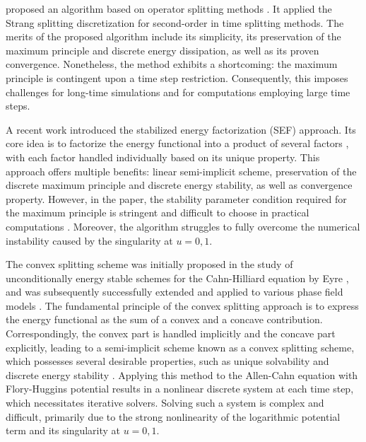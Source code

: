 \par \cite{li2022stability} proposed an algorithm based on operator splitting methods \cite{macnamara2017operator}. 
It applied the Strang splitting discretization \cite{strang1968construction} for second-order in time splitting methods. 
The merits of the proposed algorithm include its simplicity, its preservation of the maximum principle and discrete energy dissipation, as well as its proven convergence. 
Nonetheless, the method exhibits a shortcoming: the maximum principle is contingent upon a time step restriction. 
Consequently, this imposes challenges for long-time simulations and for computations employing large time steps.
\par A recent work \cite{wang2020stabilized} introduced the stabilized energy factorization (SEF) approach. 
Its core idea is to factorize the energy functional into a product of several factors  \cite{kou2020novel}, 
with each factor handled individually based on its unique property. 
This approach offers multiple benefits: linear semi-implicit scheme, preservation of the discrete maximum principle and discrete energy stability, as well as convergence property. 
However, in the paper, the stability parameter condition required for the maximum principle is stringent and difficult to choose in practical computations \cite{wang2020stabilized}. 
Moreover, the algorithm struggles to fully overcome the numerical instability caused by the singularity at $u=0,1$.
\par The convex splitting scheme was initially proposed in the study of unconditionally energy stable schemes for the Cahn-Hilliard equation by Eyre \cite{eyre1998unconditionally}, 
and was subsequently successfully extended and applied to various phase field models \cite{chen2012linear,shen2012second,baskaran2013convergence}. 
The fundamental principle of the convex splitting approach is to express the energy functional as the sum of a convex and a concave contribution. 
Correspondingly, the convex part is handled implicitly and the concave part explicitly, 
leading to a semi-implicit scheme known as a convex splitting scheme, 
which possesses several desirable properties, such as unique solvability and discrete energy stability \cite{eyre1998unconditionally,du2020phase}. 
Applying this method to the Allen-Cahn equation with Flory-Huggins potential results in a nonlinear discrete system at each time step, 
which necessitates iterative solvers. 
Solving such a system is complex and difficult, primarily due to the strong nonlinearity of the logarithmic potential term and its singularity at $u=0,1$.
